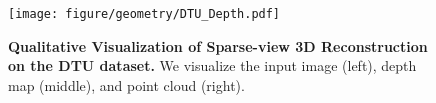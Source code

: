 \begin{figure}
\begin{center}
\texttt{[image: figure/geometry/DTU\_Depth.pdf]}
\end{center}
\caption{
    \textbf{Qualitative Visualization of Sparse-view 3D Reconstruction on the DTU dataset.}
    We visualize the input image (left), depth map (middle), and point cloud (right).
}
\label{fig:depth}
\end{figure}

    